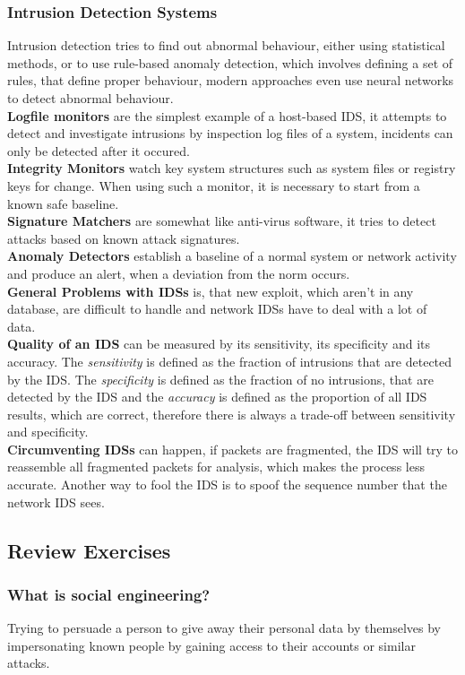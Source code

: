 \documentclass[a4paper, 10 pt, conference]{ieeeconf}
\begin{document}
\subsubsection{\textbf{Intrusion Detection Systems}}
Intrusion detection tries to find out abnormal behaviour, either using statistical methods, or to use rule-based anomaly detection, which involves defining a set of rules, that define proper behaviour, modern approaches even use neural networks to detect abnormal behaviour. \\
\textbf{Logfile monitors} are the simplest example of a host-based IDS, it attempts to detect and investigate intrusions by inspection log files of a system, incidents can only be detected after it occured. \\
\textbf{Integrity Monitors} watch key system structures such as system files or registry keys for change. When using such a monitor, it is necessary to start from a known safe baseline.\\
\textbf{Signature Matchers} are somewhat like anti-virus software, it tries to detect attacks based on known attack signatures. \\
\textbf{Anomaly Detectors} establish a baseline of a normal system or network activity and produce an alert, when a deviation from the norm occurs. \\
\textbf{General Problems with IDSs} is, that new exploit, which aren't in any database, are difficult to handle and network IDSs have to deal with a lot of data. \\
\textbf{Quality of an IDS} can be measured by its sensitivity, its specificity and its accuracy. The \emph{sensitivity} is defined as the fraction of intrusions that are detected by the IDS. The \emph{specificity} is defined as the fraction of no intrusions, that are detected by the IDS and the \emph{accuracy} is defined as the proportion of all IDS results, which are correct, therefore there is always a trade-off between sensitivity and specificity. \\
\textbf{Circumventing IDSs} can happen, if packets are fragmented, the IDS will try to reassemble all fragmented packets for analysis, which makes the process less accurate. Another way to fool the IDS is to spoof the sequence number that the network IDS sees. 


\subsection{\textbf{Review Exercises}}
\subsubsection{\textbf{What is social engineering?}}
Trying to persuade a person to give away their personal data by themselves by impersonating known people by gaining access to their accounts or similar attacks.
\end{document}
